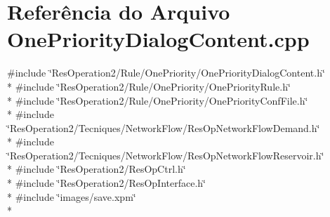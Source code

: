 \section{Referência do Arquivo One\+Priority\+Dialog\+Content.\+cpp}
\label{_one_priority_dialog_content_8cpp}
{\ttfamily \#include \char`\"{}Res\+Operation2/\+Rule/\+One\+Priority/\+One\+Priority\+Dialog\+Content.\+h\char`\"{}}\\*
{\ttfamily \#include \char`\"{}Res\+Operation2/\+Rule/\+One\+Priority/\+One\+Priority\+Rule.\+h\char`\"{}}\\*
{\ttfamily \#include \char`\"{}Res\+Operation2/\+Rule/\+One\+Priority/\+One\+Priority\+Conf\+File.\+h\char`\"{}}\\*
{\ttfamily \#include \char`\"{}Res\+Operation2/\+Tecniques/\+Network\+Flow/\+Res\+Op\+Network\+Flow\+Demand.\+h\char`\"{}}\\*
{\ttfamily \#include \char`\"{}Res\+Operation2/\+Tecniques/\+Network\+Flow/\+Res\+Op\+Network\+Flow\+Reservoir.\+h\char`\"{}}\\*
{\ttfamily \#include \char`\"{}Res\+Operation2/\+Res\+Op\+Ctrl.\+h\char`\"{}}\\*
{\ttfamily \#include \char`\"{}Res\+Operation2/\+Res\+Op\+Interface.\+h\char`\"{}}\\*
{\ttfamily \#include \char`\"{}images/save.\+xpm\char`\"{}}\\*
